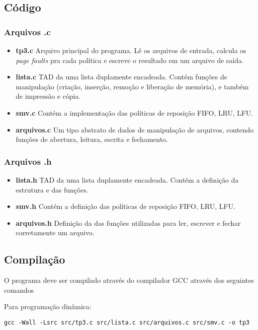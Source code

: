 \documentclass[12pt]{article}
\begin{document}
\subsection{Código}

\subsubsection{Arquivos .c}

\begin{itemize}
\item \textbf{tp3.c} Arquivo principal do programa. Lê os arquivos de entrada, calcula os \textit{page faults} pra cada política e escreve o resultado em um arquivo de saída.
\item \textbf{lista.c} TAD da uma lista duplamente encadeada. Contém funções de manipulação (criação, inserção, remoção e liberação de memória), e também de impressão e cópia.
\item \textbf{smv.c} Contém a implementação das políticas de reposição FIFO, LRU, LFU.
\item \textbf{arquivos.c} Um tipo abstrato de dados de manipulação de arquivos, contendo funções de abertura, leitura, escrita e fechamento.
\end{itemize}

\subsubsection{Arquivos .h}

\begin{itemize}
\item \textbf{lista.h} TAD da uma lista duplamente encadeada. Contém a definição da estrutura e das funções.
\item \textbf{smv.h} Contém a definição das políticas de reposição FIFO, LRU, LFU.
\item \textbf{arquivos.h} Definição da das funções utilizadas para ler, escrever e fechar corretamente um arquivo.
\end{itemize}

\subsection{Compilação}

O programa deve ser compilado através do compilador GCC através dos seguintes comandos

Para programação dinâmica:
\begin{footnotesize}
\begin{verbatim}
gcc -Wall -Lsrc src/tp3.c src/lista.c src/arquivos.c src/smv.c -o tp3 \end{verbatim}
\end{footnotesize}
\end{document}
